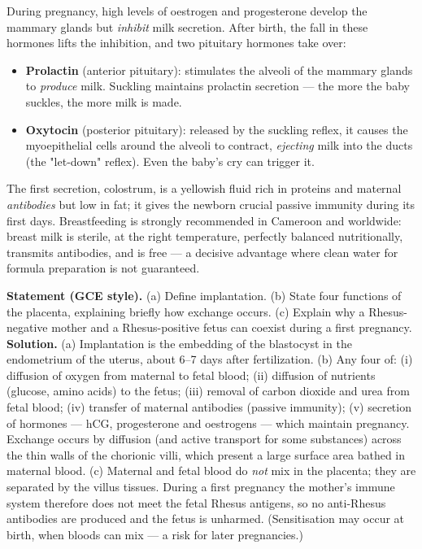 \documentclass[11pt]{article}
\newcommand{\cle}[1]{{\popxbold\color{popdark}#1}}
\newcounter{popsec}
\newcounter{popsub}
\newcommand{\courssub}[1]{%
  \stepcounter{popsub}%
  \par\vspace{9pt}\noindent{\popxbold\fontsize{11.5}{13}\selectfont\color{popink}{\color{poporange}\thepopsec.\thepopsub}\hspace{6pt}#1}\par\nopagebreak\vspace{4pt}
}
\begin{document}
\courssub{Lactation: Feeding the Newborn}

During pregnancy, high levels of oestrogen and progesterone develop the mammary glands but \emph{inhibit} milk secretion. After birth, the fall in these hormones lifts the inhibition, and two pituitary hormones take over:

\begin{itemize}
\item \textbf{Prolactin} (anterior pituitary): stimulates the alveoli of the mammary glands to \emph{produce} milk. Suckling maintains prolactin secretion — the more the baby suckles, the more milk is made.
\item \textbf{Oxytocin} (posterior pituitary): released by the suckling reflex, it causes the myoepithelial cells around the alveoli to contract, \emph{ejecting} milk into the ducts (the "let-down" reflex). Even the baby's cry can trigger it.
\end{itemize}

The first secretion, \cle{colostrum}, is a yellowish fluid rich in proteins and maternal \emph{antibodies} but low in fat; it gives the newborn crucial passive immunity during its first days. Breastfeeding is strongly recommended in Cameroon and worldwide: breast milk is sterile, at the right temperature, perfectly balanced nutritionally, transmits antibodies, and is free — a decisive advantage where clean water for formula preparation is not guaranteed.

\begin{exoresolu}
\textbf{Statement (GCE style).} (a) Define implantation. (b) State four functions of the placenta, explaining briefly how exchange occurs. (c) Explain why a Rhesus-negative mother and a Rhesus-positive fetus can coexist during a first pregnancy.
\tcblower
\textbf{Solution.} (a) Implantation is the embedding of the blastocyst in the endometrium of the uterus, about 6–7 days after fertilization.
(b) Any four of: (i) diffusion of oxygen from maternal to fetal blood; (ii) diffusion of nutrients (glucose, amino acids) to the fetus; (iii) removal of carbon dioxide and urea from fetal blood; (iv) transfer of maternal antibodies (passive immunity); (v) secretion of hormones — hCG, progesterone and oestrogens — which maintain pregnancy. Exchange occurs by diffusion (and active transport for some substances) across the thin walls of the chorionic villi, which present a large surface area bathed in maternal blood.
(c) Maternal and fetal blood do \emph{not} mix in the placenta; they are separated by the villus tissues. During a first pregnancy the mother's immune system therefore does not meet the fetal Rhesus antigens, so no anti-Rhesus antibodies are produced and the fetus is unharmed. (Sensitisation may occur at birth, when bloods can mix — a risk for later pregnancies.)
\end{exoresolu}
\end{document}
